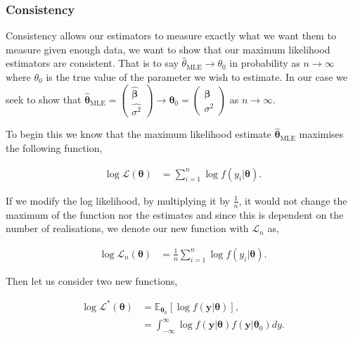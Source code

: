 \documentclass[honours,12pt]{unswthesis}
\newcommand{\E}{\mathbb{E}}
\newcommand{\mle}{\hat{\bm{\theta}}_{\text{MLE}}}
\newcommand{\y}{\mathbf{y}}
\numberwithin{equation}{section}
\begin{document}

\subsubsection{Consistency} \label{real:consistency}


\indent Consistency allows our estimators to measure exactly what we want them to measure given enough data, we want to show that our maximum likelihood estimators are consistent. That is to say $\hat{\theta}_{\text{MLE}} \rightarrow \theta_{0}$ in probability as $n \rightarrow \infty$ where $\theta_{0}$ is the true value of the parameter we wish to estimate. In our case we seek to show that $\mle = \begin{pmatrix} \hat{\bm{\beta}} \\ \widehat{\sigma^{2}} \end{pmatrix} \rightarrow \bm{\theta}_{0}  = \begin{pmatrix} \bm{\beta} \\ \sigma^{2} \end{pmatrix}$ as $n \rightarrow \infty$.\par

To begin this we know that the maximum likelihood estimate $\mle$ maximises the following function,

\begin{align*}
	\log{\mathcal{L}(\bm{\theta})} &= \sum_{i=1}^{n} \log{f(y_{i} | \bm{\theta})}.
\end{align*}

\noindent If we modify the log likelihood, by multiplying it by $\frac{1}{n}$, it would not change the maximum of the function nor the estimates and since this is dependent on the number of realisations, we denote our new function with $\mathcal{L}_{n}$ as,

\begin{align*}
	\log{\mathcal{L}_{n}(\bm{\theta})} &= \frac{1}{n} \sum_{i=1}^{n} \log{f(y_{i} | \bm{\theta})}.
\end{align*}

\noindent Then let us consider two new functions,

\begin{align*}
	\log{\mathcal{L}}^{*}(\bm{\theta}) &= \E_{\bm{\theta}_{0}} \left[ \log{f(\y|\bm{\theta})} \right],\\
	&= \int_{-\infty}^{\infty} \log{f(\y|\bm{\theta})} f(\y|\bm{\theta}_{0}) dy.
\end{align*}
\end{document}
